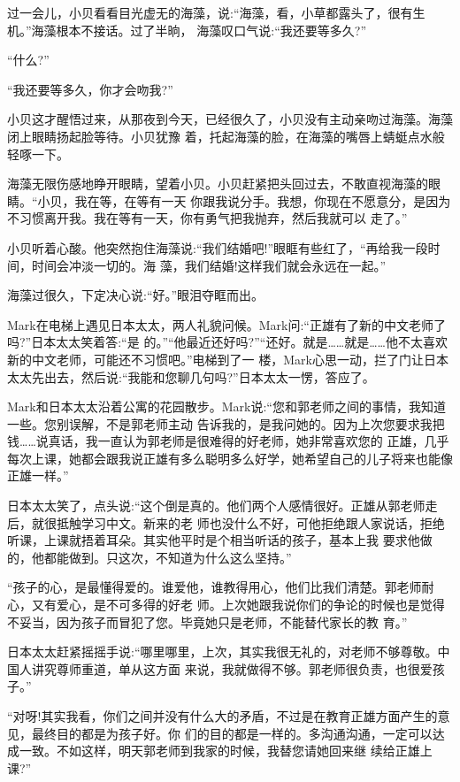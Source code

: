 \documentclass[11pt,a4paper,onecolumn]{article}
\begin{document}
过一会儿，小贝看看目光虚无的海藻，说:``海藻，看，小草都露头了，很有生机。''海藻根本不接话。过了半晌，
海藻叹口气说:``我还要等多久?''

``什么?''

``我还要等多久，你才会吻我?''

小贝这才醒悟过来，从那夜到今天，已经很久了，小贝没有主动亲吻过海藻。海藻闭上眼睛扬起脸等待。小贝犹豫
着，托起海藻的脸，在海藻的嘴唇上蜻蜓点水般轻啄一下。

海藻无限伤感地睁开眼睛，望着小贝。小贝赶紧把头回过去，不敢直视海藻的眼睛。``小贝，我在等，在等有一天
你跟我说分手。我想，你现在不愿意分，是因为不习惯离开我。我在等有一天，你有勇气把我抛弃，然后我就可以
走了。''

小贝听着心酸。他突然抱住海藻说:``我们结婚吧!''眼眶有些红了，``再给我一段时间，时间会冲淡一切的。海
藻，我们结婚!这样我们就会永远在一起。''

海藻过很久，下定决心说:``好。''眼泪夺眶而出。

Mark在电梯上遇见日本太太，两人礼貌问候。Mark问:``正雄有了新的中文老师了吗?''日本太太笑着答:``是
的。''``他最近还好吗?''``还好。就是……就是……他不太喜欢新的中文老师，可能还不习惯吧。''电梯到了一
楼，Mark心思一动，拦了门让日本太太先出去，然后说:``我能和您聊几句吗?''日本太太一愣，答应了。

Mark和日本太太沿着公寓的花园散步。Mark说:``您和郭老师之间的事情，我知道一些。您别误解，不是郭老师主动
告诉我的，是我问她的。因为上次您要求我把钱……说真话，我一直认为郭老师是很难得的好老师，她非常喜欢您的
正雄，几乎每次上课，她都会跟我说正雄有多么聪明多么好学，她希望自己的儿子将来也能像正雄一样。''

日本太太笑了，点头说:``这个倒是真的。他们两个人感情很好。正雄从郭老师走后，就很抵触学习中文。新来的老
师也没什么不好，可他拒绝跟人家说话，拒绝听课，上课就捂着耳朵。其实他平时是个相当听话的孩子，基本上我
要求他做的，他都能做到。只这次，不知道为什么这么坚持。''

``孩子的心，是最懂得爱的。谁爱他，谁教得用心，他们比我们清楚。郭老师耐心，又有爱心，是不可多得的好老
师。上次她跟我说你们的争论的时候也是觉得不妥当，因为孩子而冒犯了您。毕竟她只是老师，不能替代家长的教
育。''

日本太太赶紧摇摇手说:``哪里哪里，上次，其实我很无礼的，对老师不够尊敬。中国人讲究尊师重道，单从这方面
来说，我就做得不够。郭老师很负责，也很爱孩子。''

``对呀!其实我看，你们之间并没有什么大的矛盾，不过是在教育正雄方面产生的意见，最终目的都是为孩子好。你
们的目的都是一样的。多沟通沟通，一定可以达成一致。不如这样，明天郭老师到我家的时候，我替您请她回来继
续给正雄上课?''
\end{document}
